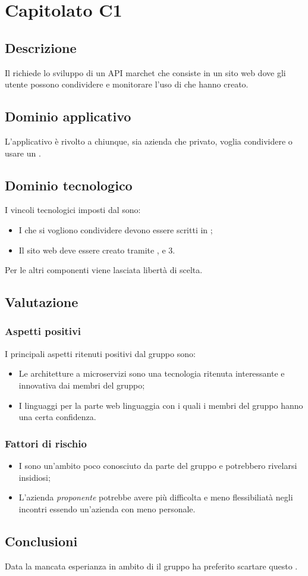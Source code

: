 \documentclass[../StudioDiFattibilita.tex]{subfiles}
\begin{document}
	\section{Capitolato C1}
		\subsection{Descrizione}
		Il  richiede lo sviluppo di un API marchet che consiste in un sito web dove gli utente possono condividere e monitorare l'uso di  che hanno creato.
		\subsection{Dominio applicativo}
		L'applicativo è rivolto a chiunque, sia azienda che privato, voglia condividere o usare un .
		\subsection{Dominio tecnologico} 
		I vincoli tecnologici imposti dal  sono:
		\begin{itemize}
			\item I  che si vogliono condividere devono essere scritti in ;
			\item	Il sito web deve essere creato tramite ,  e 3.
		\end{itemize}
		Per le altri componenti viene lasciata libertà di scelta.
		\subsection{Valutazione}
			\subsubsection{Aspetti positivi}
			I principali aspetti ritenuti positivi dal gruppo sono:
				\begin{itemize}
				\item Le architetture a microservizi sono una tecnologia ritenuta interessante e innovativa dai membri del gruppo; 
				\item I linguaggi per la parte web linguaggia con i quali i membri del gruppo hanno una certa confidenza.
			\end{itemize}
			\subsubsection{Fattori di rischio}
				\begin{itemize}
				\item I  sono un'ambito poco conosciuto da parte del gruppo e potrebbero rivelarsi insidiosi;
				\item L'azienda \textit{proponente} potrebbe avere più difficolta e meno flessibiliatà negli incontri essendo un'azienda con meno personale.
			\end{itemize}
			\subsection{Conclusioni}
			Data la mancata esperianza in ambito di  il gruppo ha preferito scartare questo .
\end{document}
